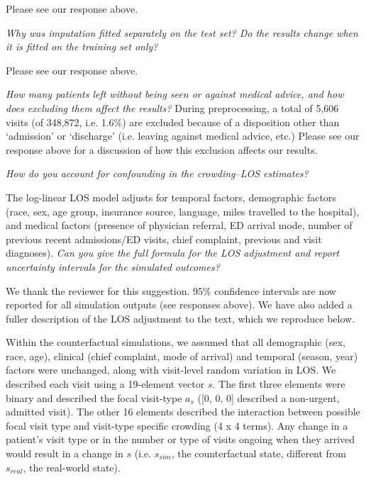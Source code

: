Please see our response above.

\textit{     Why was imputation fitted separately on the test set? Do the results change when it is fitted on the training set only?}

Please see our response above.

\textit{     How many patients left without being seen or against medical advice, and how does excluding them affect the results?
}
During preprocessing, a total of 5,606 visits (of 348,872, i.e. 1.6\%) are excluded because of a disposition other than `admission' or `discharge' (i.e. leaving against medical advice, etc.) Please see our response above for a discussion of how this exclusion affects our results.

\textit{     How do you account for confounding in the crowding–LOS estimates?}

The log-linear LOS model adjusts for temporal factors, demographic factors (race, sex, age group, insurance source, language, miles travelled to the hospital), and medical factors (presence of physician referral, ED arrival mode, number of previous recent admissions/ED visits, chief complaint, previous and visit diagnoses).  
\textit{
     Can you give the full formula for the LOS adjustment and report uncertainty intervals for the simulated outcomes?}

We thank the reviewer for this suggestion. 95\% confidence intervals are now reported for all simulation outputs (see responses above). We have also added a fuller description of the LOS adjustment to the text, which we reproduce below.

Within the counterfactual simulations, we assumed that all demographic (sex, race, age), clinical (chief complaint, mode of arrival) and temporal (season, year) factors were unchanged, along with visit-level random variation in LOS. We described each visit using a 19-element vector \(s\). The first three elements were binary and described the focal visit-type \(a_s\) ([0, 0, 0] described a non-urgent, admitted visit). The other 16 elements described the interaction between possible focal visit type and visit-type specific crowding (4 x 4 terms). Any change in a patient's visit type or in the number or type of visits ongoing when they arrived would result in a change in \(s\) (i.e. \(s_{sim}\), the counterfactual state, different from \(s_{real}\), the real-world state). 

